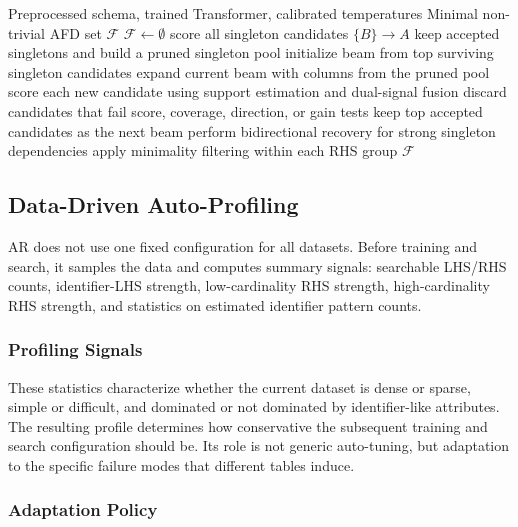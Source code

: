 \documentclass[conference]{IEEEtran}
\begin{document}
\begin{algorithm}[t]
\caption{AR Search Pipeline}
\label{alg:ar}
\begin{algorithmic}[1]
\REQUIRE Preprocessed schema, trained Transformer, calibrated temperatures
\ENSURE Minimal non-trivial AFD set $\mathcal{F}$
\STATE $\mathcal{F} \leftarrow \emptyset$
    \STATE score all singleton candidates $\{B\}\to A$
    \STATE keep accepted singletons and build a pruned singleton pool
    \STATE initialize beam from top surviving singleton candidates
        \STATE expand current beam with columns from the pruned pool
        \STATE score each new candidate using support estimation and dual-signal fusion
        \STATE discard candidates that fail score, coverage, direction, or gain tests
        \STATE keep top accepted candidates as the next beam
    \ENDFOR
\ENDFOR
\STATE perform bidirectional recovery for strong singleton dependencies
\STATE apply minimality filtering within each RHS group
\RETURN $\mathcal{F}$
\end{algorithmic}
\end{algorithm}

\subsection{Data-Driven Auto-Profiling}\label{sec:autoprofile}

AR does not use one fixed configuration for all datasets. Before training and search, it samples the data and computes summary signals: searchable LHS/RHS counts, identifier-LHS strength, low-cardinality RHS strength, high-cardinality RHS strength, and statistics on estimated identifier pattern counts.

\subsubsection{Profiling Signals}

These statistics characterize whether the current dataset is dense or sparse, simple or difficult, and dominated or not dominated by identifier-like attributes. The resulting profile determines how conservative the subsequent training and search configuration should be. Its role is not generic auto-tuning, but adaptation to the specific failure modes that different tables induce.

\subsubsection{Adaptation Policy}
\end{document}
